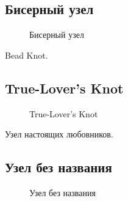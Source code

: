 \subsection{Бисерный узел}

\begin{figure}[H]\centering
	\begin{minipage}{1\linewidth}
		\begin{center}
			\tcbox[enhanced jigsaw,colframe=black,opacityframe=0.5,opacityback=0.5]
			{}
		\end{center}
	\end{minipage}
\caption{Бисерный узел}
	\label{ris:Bead_Knot}
\end{figure}

Bead Knot.

\subsection{True-Lover’s Knot}

\begin{figure}[H]\centering
	\begin{minipage}{1\linewidth}
		\begin{center}
			\tcbox[enhanced jigsaw,colframe=black,opacityframe=0.5,opacityback=0.5]
			{}
		\end{center}
	\end{minipage}
\caption{True-Lover’s Knot}
	\label{ris:True-Lover_Knot}
\end{figure}

Узел настоящих любовников.

\addtocounter{KnotNoName}{1}

\subsection{Узел без названия }

\begin{figure}[H]\centering
	\begin{minipage}{1\linewidth}
		\begin{center}
			\tcbox[enhanced jigsaw,colframe=black,opacityframe=0.5,opacityback=0.5]
			{}
		\end{center}
	\end{minipage}
\caption{Узел без названия }
	\label{ris:KnotNoName_18}
\end{figure}

